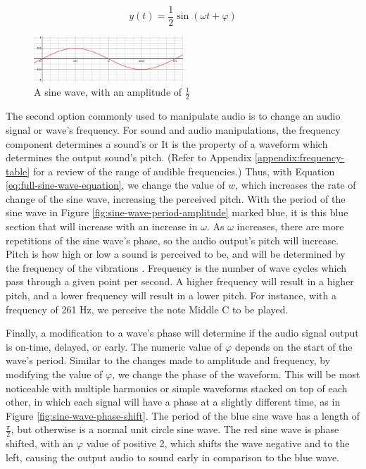 \begin{equation}\label{eq:half-sized-sine-wave}
	y(t) = \frac{1}{2} \sin(\omega t + \varphi)
\end{equation}

\begin{figure}[ht]
	\centering
	\includegraphics[width=0.5\textwidth]{figures/half-sized-sine-wave.png}
	\caption{A sine wave, with an amplitude of $\frac{1}{2}$}
	\label{fig:half-sized-sine-wave}
\end{figure}

The second option commonly used to manipulate audio is to change an audio signal or wave's frequency. For sound and audio manipulations, the frequency component determines a sound's  or  It is the property of a waveform which determines the output sound's pitch. (Refer to Appendix \ref{appendix:frequency-table} for a review of the range of audible frequencies.) Thus, with Equation \ref{eq:full-sine-wave-equation}, we change the value of $w$, which increases the rate of change of the sine wave, increasing the perceived pitch. With the period of the sine wave in Figure \ref{fig:sine-wave-period-amplitude} marked blue, it is this blue section that will increase with an increase in $\omega$. As $\omega$ increases, there are more repetitions of the sine wave's phase, so the audio output's pitch will increase. Pitch is how high or low a sound is perceived to be, and will be determined by the frequency of the vibrations \cite{Toft_2020}. Frequency is the number of wave cycles which pass through a given point per second. A higher frequency will result in a higher pitch, and a lower frequency will result in a lower pitch. For instance, with a frequency of 261 Hz, we perceive the note Middle C to be played. 

Finally, a modification to a wave's phase will determine if the audio signal output is on-time, delayed, or early. The numeric value of $\varphi$ depends on the start of the wave's period. Similar to the changes made to amplitude and frequency, by modifying the value of $\varphi$, we change the phase of the waveform. This will be most noticeable with multiple harmonics or simple waveforms stacked on top of each other, in which each signal will have a phase at a slightly different time, as in Figure \ref{fig:sine-wave-phase-shift}. The period of the blue sine wave has a length of $\frac{\pi}{2}$, but otherwise is a normal unit circle sine wave. The red sine wave is phase shifted, with an $\varphi$ value of positive 2, which shifts the wave negative and to the left, causing the output audio to sound early in comparison to the blue wave. 

